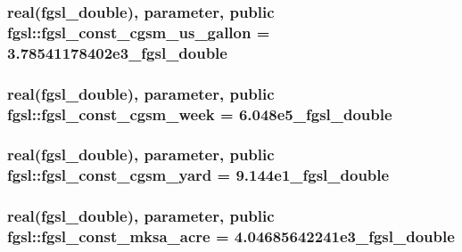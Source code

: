 \hypertarget{classfgsl_a9fdaf0160e636b5a341738f1038e6671}{
\subsubsection[{fgsl\-\_\-const\-\_\-cgsm\-\_\-us\-\_\-gallon}]{\setlength{\rightskip}{0pt plus 5cm}real({\bf fgsl\-\_\-double}), parameter, public fgsl\-::fgsl\-\_\-const\-\_\-cgsm\-\_\-us\-\_\-gallon = 3.\-78541178402e3\-\_\-fgsl\-\_\-double}}\label{classfgsl_a9fdaf0160e636b5a341738f1038e6671}
\hypertarget{classfgsl_ab1a6fad27f87e45e6de1d5b58d7b86fc}{
\subsubsection[{fgsl\-\_\-const\-\_\-cgsm\-\_\-week}]{\setlength{\rightskip}{0pt plus 5cm}real({\bf fgsl\-\_\-double}), parameter, public fgsl\-::fgsl\-\_\-const\-\_\-cgsm\-\_\-week = 6.\-048e5\-\_\-fgsl\-\_\-double}}\label{classfgsl_ab1a6fad27f87e45e6de1d5b58d7b86fc}
\hypertarget{classfgsl_a3f40255d359411c5789f360fd7c2961e}{
\subsubsection[{fgsl\-\_\-const\-\_\-cgsm\-\_\-yard}]{\setlength{\rightskip}{0pt plus 5cm}real({\bf fgsl\-\_\-double}), parameter, public fgsl\-::fgsl\-\_\-const\-\_\-cgsm\-\_\-yard = 9.\-144e1\-\_\-fgsl\-\_\-double}}\label{classfgsl_a3f40255d359411c5789f360fd7c2961e}
\hypertarget{classfgsl_a58e85d8e8be547abd415a03ac8cfe6d9}{
\subsubsection[{fgsl\-\_\-const\-\_\-mksa\-\_\-acre}]{\setlength{\rightskip}{0pt plus 5cm}real({\bf fgsl\-\_\-double}), parameter, public fgsl\-::fgsl\-\_\-const\-\_\-mksa\-\_\-acre = 4.\-04685642241e3\-\_\-fgsl\-\_\-double}}\label{classfgsl_a58e85d8e8be547abd415a03ac8cfe6d9}
